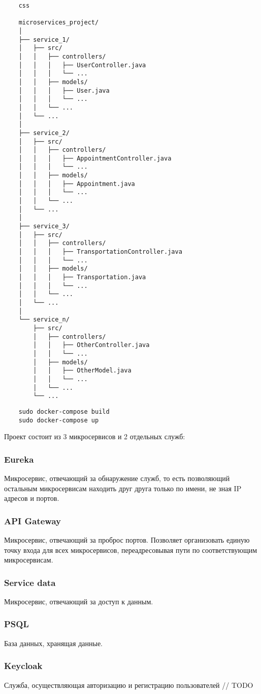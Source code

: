     \begin{lstlisting}
    css
    
    microservices_project/
    │
    ├── service_1/
    │   ├── src/
    │   │   ├── controllers/
    │   │   │   ├── UserController.java
    │   │   │   └── ...
    │   │   ├── models/
    │   │   │   ├── User.java
    │   │   │   └── ...
    │   │   └── ...
    │   └── ...
    │
    ├── service_2/
    │   ├── src/
    │   │   ├── controllers/
    │   │   │   ├── AppointmentController.java
    │   │   │   └── ...
    │   │   ├── models/
    │   │   │   ├── Appointment.java
    │   │   │   └── ...
    │   │   └── ...
    │   └── ...
    │
    ├── service_3/
    │   ├── src/
    │   │   ├── controllers/
    │   │   │   ├── TransportationController.java
    │   │   │   └── ...
    │   │   ├── models/
    │   │   │   ├── Transportation.java
    │   │   │   └── ...
    │   │   └── ...
    │   └── ...
    │
    └── service_n/
        ├── src/
        │   ├── controllers/
        │   │   ├── OtherController.java
        │   │   └── ...
        │   ├── models/
        │   │   ├── OtherModel.java
        │   │   └── ...
        │   └── ...
        └── ...
    \end{lstlisting}
    
    \begin{lstlisting}
    sudo docker-compose build
    sudo docker-compose up
    \end{lstlisting}

    Проект состоит из 3 микросервисов и 2 отдельных служб:

    \subsubsection{Eureka}
        Микросервис, отвечающий за обнаружение служб, то есть позволяющий остальным микросервисам находить друг друга только по имени, не зная IP адресов и портов.

    \subsubsection{API Gateway}
        Микросервис, отвечающий за проброс портов. Позволяет организовать единую точку входа для всех микросервисов, переадресовывая пути по соответствующим микросервисам.

    \subsubsection{Service data}
        Микросервис, отвечающий за доступ к данным.

    \subsubsection{PSQL}
        База данных, хранящая данные.

    \subsubsection{Keycloak}
        Служба, осуществляющая авторизацию и регистрацию пользователей
    // TODO


\clearpage